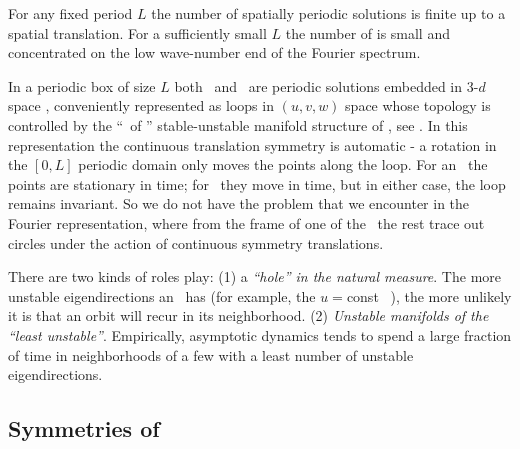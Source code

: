 For any fixed period $L$ the number
of spatially periodic solutions is finite up to a spatial translation.
For a sufficiently small $L$
the number of {\eqva} is small and
concentrated on the low wave-number end of the Fourier spectrum.

In a periodic box of size $L$
both \eqva\ and \reqva\ are  periodic solutions
embedded in 3-$d$ space ,
conveniently represented as loops in
$(u,v,w)$ space whose topology is controlled by the
``\eqva\ of \eqva'' stable-unstable manifold structure of
, see .
In this representation the continuous translation symmetry
is automatic - a rotation in the $[0,L]$ periodic domain only
moves the points along the loop. For an \eqv\ the points
are stationary in time; for \reqv\ they move in time, but in
either case, the loop remains invariant.
So we do not have the problem that we encounter in the Fourier
representation, where from the frame of one of the \eqva\
the rest trace out circles under the action of continuous symmetry
translations.

%
There are two kinds of roles
{\eqva} play:
(1)
a {\em ``hole'' in the natural measure}.
The more unstable eigendirections an \eqv\ has (for example, the
$u=$const \eqv~\EQV{0}), the more unlikely it is  that
an orbit will recur in its neighborhood.
(2)
{\em Unstable manifolds of the ``least unstable''{\eqva}}.
Empirically, asymptotic dynamics tends to spend
a large fraction of time in
neighborhoods of a few  {\eqva} with
a least number of unstable eigendirections.



\subsection{Symmetries of \KSe}
\label{sec:KSeSymm}

